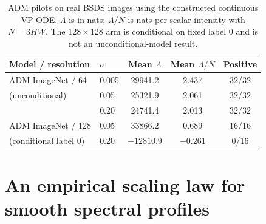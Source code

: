 \documentclass[10pt,journal]{IEEEtran}
\newcommand{\Lam}{\Lambda}
\begin{document}
\begin{table}[t]
  \centering
  \caption{ADM pilots on real BSDS images using the constructed continuous VP-ODE. $\Lam$ is
  in nats; $\Lam/N$ is nats per scalar intensity with $N=3HW$. The $128\times128$ arm is
  conditional on fixed label 0 and is not an unconditional-model result.}
  \label{tab:adm}
  \footnotesize
  \setlength{\tabcolsep}{3pt}
  \begin{tabular}{llccc}
    \toprule
    Model / resolution & $\sigma$ & Mean $\Lam$ & Mean $\Lam/N$ & Positive\\
    \midrule
    ADM ImageNet / 64 & 0.005 & 29941.2 & 2.437 & 32/32\\
    (unconditional) & 0.05 & 25321.9 & 2.061 & 32/32\\
    & 0.20 & 24741.4 & 2.013 & 32/32\\
    \midrule
    ADM ImageNet / 128 & 0.05 & 33866.2 & 0.689 & 16/16\\
    (conditional label 0) & 0.20 & $-12810.9$ & $-0.261$ & 0/16\\
    \bottomrule
  \end{tabular}
\end{table}

\section{An empirical scaling law for smooth spectral profiles}
\label{sec:law}
\end{document}
